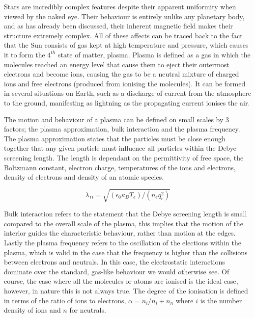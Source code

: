 Stars are incredibly complex features despite their apparent uniformity when viewed by the naked eye.
Their behaviour is entirely unlike any planetary body, and as has already been discussed, their inherent magnetic field makes their structure extremely complex.
All of these affects can be traced back to the fact that the Sun consists of gas kept at high temperature and pressure, which causes it to form the $4^{th}$ state of matter, plasma.
Plasma is defined as a gas in which the molecules reached an energy level that cause them to eject their outermost electrons and become ions, causing the gas to be a neutral mixture of charged ions and free electrons (produced from ionising the molecules).
It can be formed in several situations on Earth, such as a discharge of current from the atmosphere to the ground, manifesting as lightning as the propagating current ionises the air.

The motion and behaviour of a plasma can be defined on small scales by 3 factors; the plasma approximation, bulk interaction and the plasma frequency.
The plasma approximation states that the particles must be close enough together that any given particle must influence all particles within the Debye screening length.
The length is dependant on the permittivity of free space, the Boltzmann constant, electron charge, temperatures of the ions and electrons, density of electrons and density of an atomic species.

\begin{equation}
	\lambda_D = \sqrt{(\epsilon_0\kappa_BT_e)/(n_eq_e^2)}
\end{equation}

Bulk interaction refers to the statement that the Debye screening length is small compared to the overall scale of the plasma, this implies that the motion of the interior guides the characteristic behaviour, rather than motion at the edges.
Lastly the plasma frequency refers to the oscillation of the elections within the plasma, which is valid in the case that the frequency is higher than the collisions between electrons and neutrals.
In this case, the electrostatic interactions dominate over the standard, gas-like behaviour we would otherwise see.
Of course, the case where all the molecules or atoms are ionised is the ideal case, however, in nature this is not always true.
The degree of the ionisation is defined in terms of the ratio of ions to electrons, $\alpha = n_i/{n_i + n_n}$ where $i$ is the number density of ions and $n$ for neutrals.

